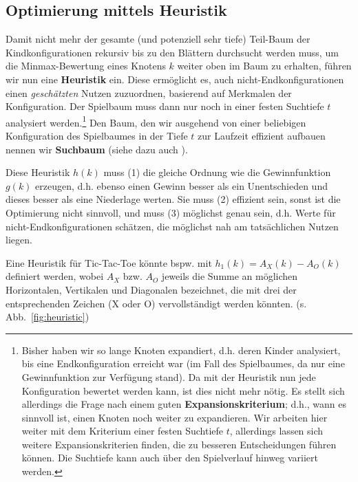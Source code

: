 \documentclass[a4paper,twoside]{scrartcl}
\makeatletter
\newcommand\footnoteref[1]{\protected@xdef\@thefnmark{\ref{#1}}\@footnotemark}
\newcommand\q[1]{\glqq #1\grqq}
\makeatother
\begin{document}
\subsection{Optimierung mittels Heuristik}
Damit nicht mehr der gesamte (und potenziell sehr tiefe) Teil-Baum der Kindkonfigurationen rekursiv bis zu den Blättern durchsucht werden muss, um die Minmax-Bewertung eines Knotens $k$ weiter oben im Baum zu erhalten, führen wir nun eine \textbf{Heuristik} ein. Diese ermöglicht es, auch nicht-Endkonfigurationen einen \textit{geschätzten} Nutzen zuzuordnen, basierend auf Merkmalen der Konfiguration. Der Spielbaum muss dann nur noch in einer festen Suchtiefe $t$ analysiert werden.\footnote{Bisher haben wir so lange Knoten expandiert, d.h. deren Kinder analysiert, bis eine Endkonfiguration erreicht war (im Fall des Spielbaumes, da nur eine Gewinnfunktion zur Verfügung stand). Da mit der Heuristik nun jede Konfiguration bewertet werden kann, ist dies nicht mehr nötig. Es stellt sich allerdings die Frage nach einem guten \textbf{Expansionskriterium}; d.h., wann es sinnvoll ist, einen Knoten noch weiter zu expandieren. Wir arbeiten hier weiter mit dem Kriterium einer festen Suchtiefe $t$, allerdings lassen sich weitere Expansionskriterien finden, die zu besseren Entscheidungen führen können. Die Suchtiefe kann auch über den Spielverlauf hinweg variiert werden.} Den Baum, den wir ausgehend von einer beliebigen Konfiguration des Spielbaumes in der Tiefe $t$ zur Laufzeit effizient aufbauen nennen wir \textbf{Suchbaum} (siehe dazu auch \footnoteref{suchbaum}).

Diese Heuristik $h(k)$ muss (1) die gleiche Ordnung wie die Gewinnfunktion $g(k)$ erzeugen, d.h. ebenso einen Gewinn besser als ein Unentschieden und dieses besser als eine Niederlage werten. Sie muss (2) effizient sein, sonst ist die Optimierung nicht sinnvoll, und muss (3) möglichst genau sein, d.h. Werte für nicht-Endkonfigurationen schätzen, die möglichst nah am tatsächlichen Nutzen liegen.

Eine Heuristik für Tic-Tac-Toe könnte bspw. mit $h_1(k) = A_X(k) - A_O(k)$ definiert werden, wobei $A_{X}$ bzw. $A_{O}$ jeweils die Summe an möglichen Horizontalen, Vertikalen und Diagonalen bezeichnet, die mit drei der entsprechenden Zeichen (\q{X} oder \q{O}) vervollständigt werden könnten. (s. Abb.~\ref{fig:heuristic})
\end{document}
